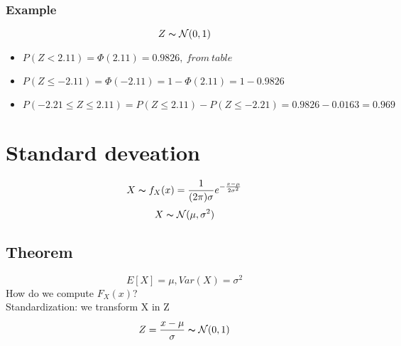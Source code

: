 \documentclass{article}
\newcommand{\N}{{\mathcal{N}}}
\begin{document}
\subsubsection{Example}
$$ Z\thicksim \N(0, 1) $$
\begin{itemize}
    \item $ P(Z<2.11) = \Phi(2.11) = 0.9826,\ from\ table $
      \item $ P(Z\le -2.11) = \Phi(-2.11) = 1-\Phi(2.11) = 1 - 0.9826 $
        \item $ P(-2.21\le Z\le 2.11) = P(Z\le 2.11) - P(Z\le -2.21) = 0.9826  - 0.0163 = 0.969 $
\end{itemize}

\section{Standard deveation}
$$ X\thicksim f_X(x) = \frac{1}{(2\pi)\sigma}e^{ -\frac{x-\mu}{2\sigma^2} } $$
$$ X\thicksim \N(\mu, \sigma^2)$$

\subsection{Theorem}
$$ E[X] = \mu, Var(X) = \sigma^2 $$
How do we compute $F_X(x)$?\\
Standardization: we transform X in Z
$$ Z = \f{x-\mu}{\sigma} \thicksim \N(0,1) $$
\end{document}
